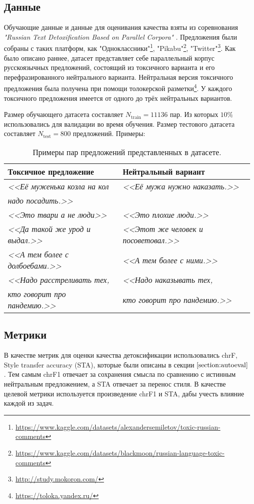 \subsection{Данные}
Обучающие данные и данные для оценивания качества взяты из соревнования \textit{"Russian Text Detoxification Based on Parallel Corpora"} \cite{russe_data}.
Предложения были собраны с таких платформ, как 
"Одноклассники"\footnote{\url{https://www.kaggle.com/datasets/alexandersemiletov/toxic-russian-comments}}, 
"Pikabu"\footnote{\url{https://www.kaggle.com/datasets/blackmoon/russian-language-toxic-comments}}, 
"Twitter"\footnote{\url{http://study.mokoron.com/}}.
Как было описано раннее, датасет представляет себе параллельный корпус русскоязычных предложений, состоящий из токсичного варианта и его перефразированного нейтрального варианта. 
Нейтральная версия токсичного предложения была получена при помощи толокерской разметки\footnote{\url{https://toloka.yandex.ru/}}. 
У каждого токсичного предложения имеется от одного до трёх нейтральных вариантов. 

Размер обучающего датасета составляет $N_{\text{train}} = 11136$ пар.
Из которых $10\%$ использовались для валидации во время обучения.
Размер тестового датасета составляет $N_{\text{test}} = 800$ предложений.
Примеры: 
\begin{table}[ht]
\centering
 \begin{tabular}{|l|l|} 
 \hline
 Токсичное предложение & Нейтральный вариант \\ [0.5ex] 
 \hline
 \textit{<<Её муженька козла на кол} & \textit{<<Её мужа нужно наказать.>>} \\
 \textit{ надо посадить.>>} &  \\
 \textit{<<Это твари а не люди>>} & \textit{<<Это плохие люди.>>} \\
 \textit{<<Да такой же урод и выдал.>>} & \textit{<<Этот же человек и посоветовал.>>} \\
 \textit{<<А тем более с долбоебами.>>} & \textit{<<А тем более с ними.>>} \\
 \textit{<<Надо расстреливать тех,} & \textit{<<Надо наказывать тех,} \\
 \textit{ кто говорит про пандемию.>>} & \textit{ кто говорит про пандемию.>>} \\
 \hline
 \end{tabular}
 \caption{Примеры пар предложений представленных в датасете.}
 \label{table:dataset_examples}
\end{table}

\subsection{Метрики}
В качестве метрик для оценки качества детоксификации использовались chrF\cite{popovic-2015-chrf}, Style transfer accuracy (STA), которые были описаны в секции $\ref{section:autoeval}$. 
Тем самым chrF1 отвечает за сохранения смысла по сравнению с истинным нейтральным предложением, а STA отвечает за перенос стиля. 
В качестве целевой метрики используется произведение chrF1 и STA, дабы учесть влияние каждой из задач.

